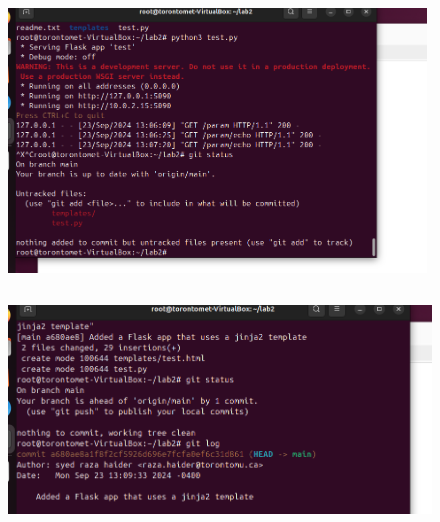 \documentclass[letterpaper,11pt]{texMemo2} %
\begin{document}
		\begin{figure}[htp]
		\centering 
		
			\includegraphics[clip,width=0.9\columnwidth,height=7cm]{14}%
		
			\includegraphics[clip,width=0.9\columnwidth,height=7cm]{15}%
		
		
		
	\end{figure}
\end{document}
